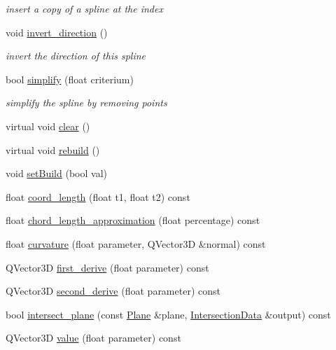 \begin{DoxyCompactItemize}
\begin{DoxyCompactList}\small\item\em insert a copy of a spline at the index \end{DoxyCompactList}\item 
void \hyperlink{classShipCAD_1_1Spline_a26293a4ee636c2b968c45731425d5c94}{invert\-\_\-direction} ()
\begin{DoxyCompactList}\small\item\em invert the direction of this spline \end{DoxyCompactList}\item 
bool \hyperlink{classShipCAD_1_1Spline_a043f418b363a0dc7161b9106a72ef8b4}{simplify} (float criterium)
\begin{DoxyCompactList}\small\item\em simplify the spline by removing points \end{DoxyCompactList}\item 
virtual void \hyperlink{classShipCAD_1_1Spline_a02967f3eee8b1755eab0d7da55c3c621}{clear} ()
\item 
virtual void \hyperlink{classShipCAD_1_1Spline_a9b466ad7510032dafb0421f2d834bde6}{rebuild} ()
\item 
void \hyperlink{classShipCAD_1_1Spline_a6e932411f0f4463514f80011c58f5e6a}{set\-Build} (bool val)
\item 
float \hyperlink{classShipCAD_1_1Spline_a33226d5554ed979f264eb4c6d533145f}{coord\-\_\-length} (float t1, float t2) const 
\item 
float \hyperlink{classShipCAD_1_1Spline_a4e03c541b7c1f96c2fe8d5b1fef558c9}{chord\-\_\-length\-\_\-approximation} (float percentage) const 
\item 
float \hyperlink{classShipCAD_1_1Spline_a755e063448eccbb2714d763596630b9d}{curvature} (float parameter, Q\-Vector3\-D \&normal) const 
\item 
Q\-Vector3\-D \hyperlink{classShipCAD_1_1Spline_aff2bf1b4b2e7b5f30e5f2ca35ec93d86}{first\-\_\-derive} (float parameter) const 
\item 
Q\-Vector3\-D \hyperlink{classShipCAD_1_1Spline_a3c560130edff8a38ed93bf95cf759137}{second\-\_\-derive} (float parameter) const 
\item 
bool \hyperlink{classShipCAD_1_1Spline_ada8dd726a502187bf0e35022576395d3}{intersect\-\_\-plane} (const \hyperlink{classShipCAD_1_1Plane}{Plane} \&plane, \hyperlink{classShipCAD_1_1IntersectionData}{Intersection\-Data} \&output) const 
\item 
Q\-Vector3\-D \hyperlink{classShipCAD_1_1Spline_aa62cf7afa6461bafce7227ec31875219}{value} (float parameter) const 

\end{DoxyCompactItemize}
